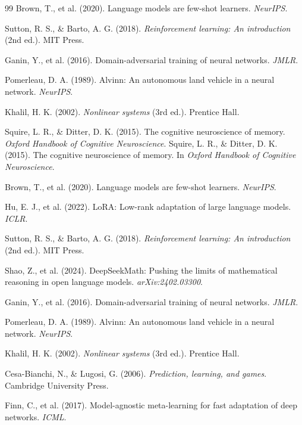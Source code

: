 \documentclass[12pt,a4paper]{article}
\begin{document}
\begin{thebibliography}{99}
Brown, T., et al. (2020). Language models are few-shot learners. \textit{NeurIPS}.

Sutton, R. S., \& Barto, A. G. (2018). \textit{Reinforcement learning: An introduction} (2nd ed.). MIT Press.

Ganin, Y., et al. (2016). Domain-adversarial training of neural networks. \textit{JMLR}.

Pomerleau, D. A. (1989). Alvinn: An autonomous land vehicle in a neural network. \textit{NeurIPS}.

Khalil, H. K. (2002). \textit{Nonlinear systems} (3rd ed.). Prentice Hall.

Squire, L. R., \& Ditter, D. K. (2015). The cognitive neuroscience of memory. \textit{Oxford Handbook of Cognitive Neuroscience}.
Squire, L. R., \& Ditter, D. K. (2015). The cognitive neuroscience of memory. In \textit{Oxford Handbook of Cognitive Neuroscience}.

Brown, T., et al. (2020). Language models are few-shot learners. \textit{NeurIPS}.

Hu, E. J., et al. (2022). LoRA: Low-rank adaptation of large language models. \textit{ICLR}.

Sutton, R. S., \& Barto, A. G. (2018). \textit{Reinforcement learning: An introduction} (2nd ed.). MIT Press.

Shao, Z., et al. (2024). DeepSeekMath: Pushing the limits of mathematical reasoning in open language models. \textit{arXiv:2402.03300}.

Ganin, Y., et al. (2016). Domain-adversarial training of neural networks. \textit{JMLR}.

Pomerleau, D. A. (1989). Alvinn: An autonomous land vehicle in a neural network. \textit{NeurIPS}.

Khalil, H. K. (2002). \textit{Nonlinear systems} (3rd ed.). Prentice Hall.

Cesa-Bianchi, N., \& Lugosi, G. (2006). \textit{Prediction, learning, and games}. Cambridge University Press.

Finn, C., et al. (2017). Model-agnostic meta-learning for fast adaptation of deep networks. \textit{ICML}.

\end{thebibliography}
\end{document}
